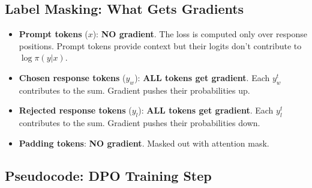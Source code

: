 \subsection{Label Masking: What Gets Gradients}
\label{label-masking-what-gets-gradients}

\begin{keybox}
\begin{itemize}
  \item \textbf{Prompt tokens} ($x$): \textbf{NO gradient}. The loss is computed only over response positions. Prompt tokens provide context but their logits don’t contribute to $\log\pi(y|x)$.
  \item \textbf{Chosen response tokens} ($y_w$): \textbf{ALL tokens get gradient}. Each $y_w^t$ contributes to the sum. Gradient pushes their probabilities up.
  \item \textbf{Rejected response tokens} ($y_l$): \textbf{ALL tokens get gradient}. Each $y_l^t$ contributes to the sum. Gradient pushes their probabilities down.
  \item \textbf{Padding tokens}: \textbf{NO gradient}. Masked out with attention mask.
\end{itemize}
\end{keybox}

\subsection{Pseudocode: DPO Training Step}
\label{pseudocode-dpo-training-step}

